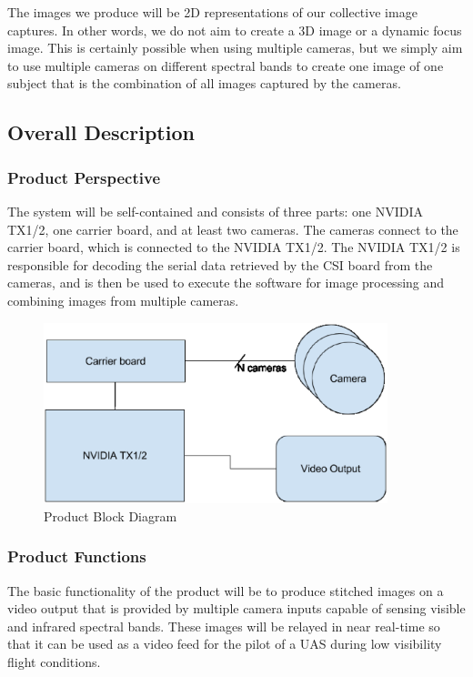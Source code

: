 The images we produce will be 2D representations of our collective image captures. In 
other words, we do not aim to create a 3D image or a dynamic focus image. This is 
certainly possible when using multiple cameras, but we simply aim to use multiple 
cameras on different spectral bands to create one image of one subject that is the 
combination of all images captured by the cameras.\\


\subsection{Overall Description}

\subsubsection{Product Perspective}

The system will be self-contained and consists of three parts: one NVIDIA TX1/2, 
one carrier board, and at least two cameras. The cameras connect to the carrier board, 
which is connected to the NVIDIA TX1/2. The NVIDIA TX1/2 is responsible for decoding 
the serial data retrieved by the CSI board from the cameras, and is then be used to 
execute the software for image processing and combining images from multiple cameras.\\

\begin{figure}[H]
	\centering
	\label{fig:ProductBlockDiagram}
	\includegraphics[width=10cm]{images/diagram.eps}
	\caption{Product Block Diagram \label{overflow}}
\end{figure}

\subsubsection{Product Functions}

The basic functionality of the product will be to produce stitched images on a video 
output that is provided by multiple camera inputs capable of sensing visible and 
infrared spectral bands. These images will be relayed in near real-time so that it 
can be used as a video feed for the pilot of a UAS during low visibility flight 
conditions. \\

